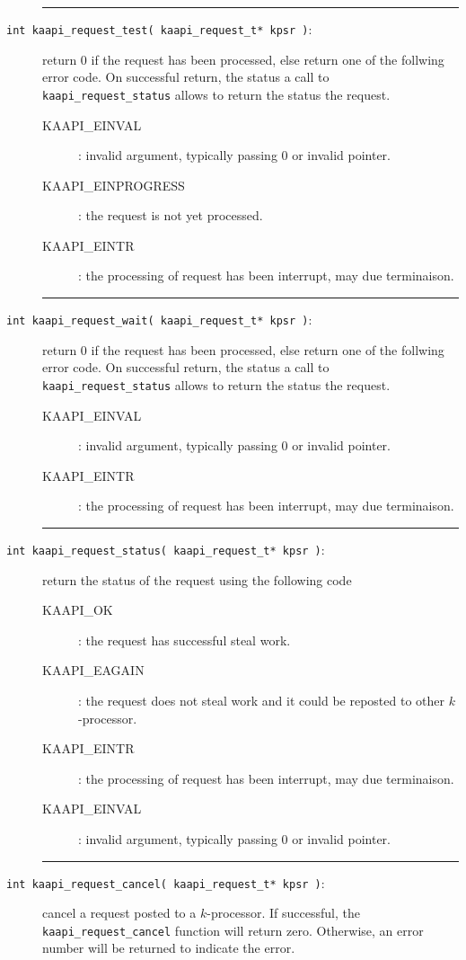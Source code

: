 \documentclass{report}
\begin{document}
\begin{description}
\vspace*{3ex} \hrule width 4cm
\item [\texttt{int kaapi\_request\_test(  kaapi\_request\_t* kpsr )}:] return 0 if the request has been processed, else return one of the follwing error code.
On successful return, the status a call to \verb+kaapi_request_status+ allows to return the status the request.
\begin{description}
\item [KAAPI\_EINVAL]: invalid argument, typically passing $0$ or invalid pointer.
\item [KAAPI\_EINPROGRESS]: the request is not yet processed.
\item [KAAPI\_EINTR]: the processing of request has been interrupt, may due terminaison.
\end{description}

\vspace*{3ex} \hrule width 4cm
\item [\texttt{int kaapi\_request\_wait(  kaapi\_request\_t* kpsr )}:] return 0 if the request has been processed, else return one of the follwing error code.
On successful return, the status a call to \verb+kaapi_request_status+ allows to return the status the request.
\begin{description}
\item [KAAPI\_EINVAL]: invalid argument, typically passing $0$ or invalid pointer.
\item [KAAPI\_EINTR]: the processing of request has been interrupt, may due terminaison.
\end{description}


\vspace*{3ex} \hrule width 4cm 
\item [\texttt{int kaapi\_request\_status(  kaapi\_request\_t* kpsr )}:] return the status of the request using the following code
\begin{description}
\item [KAAPI\_OK]: the request has successful steal work.
\item [KAAPI\_EAGAIN]: the request does not steal work and it could be reposted to other $k$-processor.
\item [KAAPI\_EINTR]: the processing of request has been interrupt, may due terminaison.
\item [KAAPI\_EINVAL]: invalid argument, typically passing $0$ or invalid pointer.
\end{description}

\vspace*{3ex} \hrule width 4cm 
\item [\texttt{int kaapi\_request\_cancel(  kaapi\_request\_t* kpsr )}:] cancel a request posted to a $k$-processor. 
If successful,  the \verb+kaapi_request_cancel+ function will return zero.  Otherwise, an error number will be returned to indicate the error.


\end{description}
\end{document}
